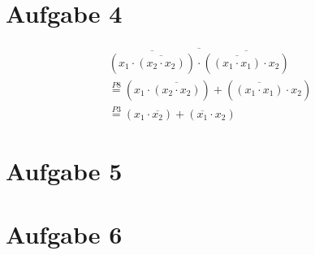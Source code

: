 \documentclass[a4paper]{article}
\begin{document}
\section*{Aufgabe 4}
\begin{equation}
\begin{aligned}
    \overline{\overline{(x_1 \cdot \overline{(x_2 \cdot x_2)})} \cdot \overline{(\overline{(x_1 \cdot x_1)} \cdot x_2)}} \\
    \stackrel{P8}{=} (x_1 \cdot \overline{(x_2 \cdot x_2)}) + (\overline{(x_1 \cdot x_1)} \cdot x_2) \\
    \stackrel{P3}{=} (x_1 \cdot \overline{x_2}) + (\overline{x_1} \cdot x_2)
\end{aligned}
\end{equation}

\section*{Aufgabe 5}
\section*{Aufgabe 6}
\end{document}
